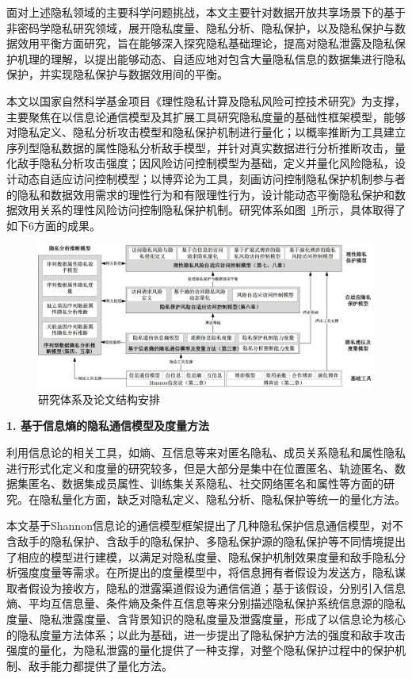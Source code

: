 \documentclass[pdftex,notypeinfo,twoside,openany,UTF8,fntef]{CASthesis}
\theoremstyle{THrm}{
	\newtheorem{question}{Question}[section]
	\newtheorem{property}{性质}[section]
	\newtheorem{assumption}{假设}[section]
	\newtheorem{claim}[lemma]{断言}
	
}
\begin{document}
面对上述隐私领域的主要科学问题挑战，本文主要针对数据开放共享场景下的基于非密码学隐私研究领域，展开隐私度量、隐私分析、隐私保护，以及隐私保护与数据效用平衡方面研究，旨在能够深入探究隐私基础理论，提高对隐私泄露及隐私保护机理的理解，以提出能够动态、自适应地对包含大量隐私信息的数据集进行隐私保护，并实现隐私保护与数据效用间的平衡。

本文以国家自然科学基金项目《理性隐私计算及隐私风险可控技术研究》为支撑，主要聚焦在以信息论通信模型及其扩展工具研究隐私度量的基础性框架模型，能够对隐私定义、隐私分析攻击模型和隐私保护机制进行量化；以概率推断为工具建立序列型隐私数据的属性隐私分析敌手模型，并针对真实数据进行分析推断攻击，量化敌手隐私分析攻击强度；因风险访问控制模型为基础，定义并量化风险隐私，设计动态自适应访问控制模型；以博弈论为工具，刻画访问控制隐私保护机制参与者的隐私和数据效用需求的理性行为和有限理性行为，设计能动态平衡隐私保护和数据效用关系的理性风险访问控制隐私保护机制。研究体系如图~\ref{fig:chapter1-research-framework}所示，具体取得了如下6方面的成果。

\begin{figure}[htbp]
	\centering
	\includegraphics[width = 0.99\linewidth]{./figures/chapter1-research-framework.jpg}
	\caption{研究体系及论文结构安排}
	\label{fig:chapter1-research-framework}
\end{figure}

\textbf{1.	基于信息熵的隐私通信模型及度量方法}

利用信息论的相关工具，如熵、互信息等来对匿名隐私、成员关系隐私和属性隐私进行形式化定义和度量的研究较多，但是大部分是集中在位置匿名、轨迹匿名、数据集匿名、数据集成员属性、训练集关系隐私、社交网络匿名和属性等方面的研究。在隐私量化方面，缺乏对隐私定义、隐私分析、隐私保护等统一的量化方法。

本文基于Shannon信息论的通信模型框架提出了几种隐私保护信息通信模型，对不含敌手的隐私保护、含敌手的隐私保护、多隐私保护源的隐私保护等不同情境提出了相应的模型进行建模，以满足对隐私度量、隐私保护机制效果度量和敌手隐私分析强度度量等需求。在所提出的度量模型中，将信息拥有者假设为发送方，隐私谋取者假设为接收方，隐私的泄露渠道假设为通信信道；基于该假设，分别引入信息熵、平均互信息量、条件熵及条件互信息等来分别描述隐私保护系统信息源的隐私度量、隐私泄露度量、含背景知识的隐私度量及泄露度量，形成了以信息论为核心的隐私度量方法体系；以此为基础，进一步提出了隐私保护方法的强度和敌手攻击强度的量化，为隐私泄露的量化提供了一种支撑，对整个隐私保护过程中的保护机制、敌手能力都提供了量化方法。
\end{document}
